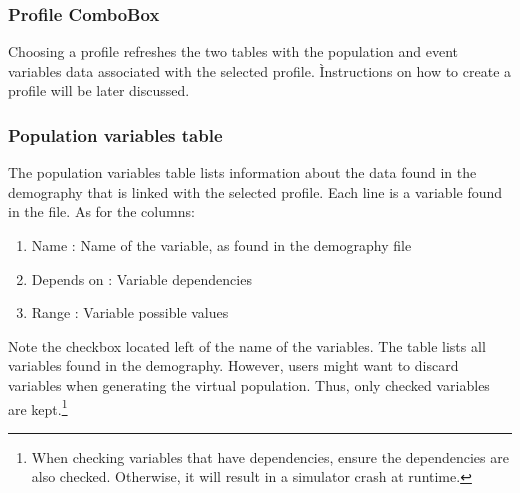 \documentclass[a4paper,11pt]{report}
\begin{document}
\subsubsection{Profile ComboBox}
Choosing a profile refreshes the two tables with the population and event variables data associated with the selected profile. Ìnstructions on how to create a profile will be later discussed.
\subsubsection{Population variables table}
The population variables table lists information about the data found in the demography that is linked with the selected profile. Each line is a variable found in the file. As for the columns:
\begin{enumerate}
\item{Name : } Name of the variable, as found in the demography file
\item{Depends on : } Variable dependencies
\item{Range : } Variable possible values
\end{enumerate}
Note the checkbox located left of the name of the variables. The table lists all variables found in the demography. However, users might want to discard variables when generating the virtual population. Thus, only checked variables are kept.\footnote{When checking variables that have dependencies, ensure the dependencies are also checked. Otherwise, it will result in a simulator crash at runtime.} 
\end{document}
